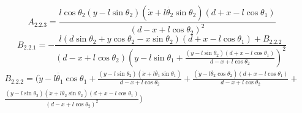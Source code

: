 \begin{equation*}
A_{2.2.3} = \frac{l\cos\theta_2(y-l\sin\theta_2)(\dot{x}+l\dot{\theta_2}\sin\theta_2)(d+x-l\cos\theta_1)}{(d-x+l\cos\theta_2)^2}
\end{equation*}
\begin{equation*}
B_{2.2.1} =  -\frac{l(d\sin\theta_2+y\cos\theta_2-x\sin\theta_2)(d+x-l\cos\theta_1)+B_{2.2.2}}{(d-x+l\cos\theta_2)(y-l\sin\theta_1+\frac{(y-l\sin\theta_2)(d+x-l\cos\theta_1)}{d-x+l\cos\theta_2})^2}
\end{equation*}
\begin{equation*}
\begin{split}
B_{2.2.2} =\Bigg (\dot{y}-l\dot{\theta_1}\cos\theta_1+\frac{(y-l\sin\theta_2)(\dot{x}+l\dot{\theta_1}\sin\theta_1)}{d-x+l\cos\theta_2}+\frac{(\dot{y}-l\dot{\theta_2}\cos\theta_2)(d+x-l\cos\theta_1)}{d-x+l\cos\theta_2}+ \\\frac{(y-l\sin\theta_2)(\dot{x}+l\dot{\theta_2}\sin\theta_2)(d+x-l\cos\theta_1)}{(d-x+l\cos\theta_2)^2}\Bigg)
\end{split}
\end{equation*}
